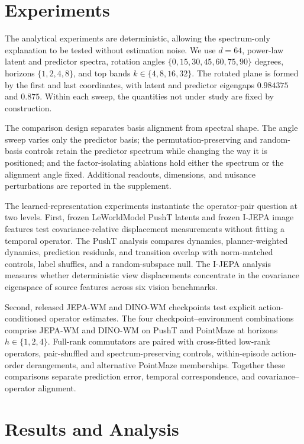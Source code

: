 \documentclass{article}
\begin{document}
\section{Experiments}

The analytical experiments are deterministic, allowing the spectrum-only explanation to be tested without estimation noise. We use $d=64$, power-law latent and predictor spectra, rotation angles $\{0,15,30,45,60,75,90\}$ degrees, horizons $\{1,2,4,8\}$, and top bands $k\in\{4,8,16,32\}$. The rotated plane is formed by the first and last coordinates, with latent and predictor eigengaps $0.984375$ and $0.875$. Within each sweep, the quantities not under study are fixed by construction.

The comparison design separates basis alignment from spectral shape. The angle sweep varies only the predictor basis; the permutation-preserving and random-basis controls retain the predictor spectrum while changing the way it is positioned; and the factor-isolating ablations hold either the spectrum or the alignment angle fixed. Additional readouts, dimensions, and nuisance perturbations are reported in the supplement.

The learned-representation experiments instantiate the operator-pair question at two levels. First, frozen LeWorldModel PushT latents and frozen I-JEPA image features test covariance-relative displacement measurements without fitting a temporal operator. The PushT analysis compares dynamics, planner-weighted dynamics, prediction residuals, and transition overlap with norm-matched controls, label shuffles, and a random-subspace null. The I-JEPA analysis measures whether deterministic view displacements concentrate in the covariance eigenspace of source features across six vision benchmarks.

Second, released JEPA-WM and DINO-WM checkpoints test explicit action-conditioned operator estimates. The four checkpoint--environment combinations comprise JEPA-WM and DINO-WM on PushT and PointMaze at horizons $h\in\{1,2,4\}$. Full-rank commutators are paired with cross-fitted low-rank operators, pair-shuffled and spectrum-preserving controls, within-episode action-order derangements, and alternative PointMaze memberships. Together these comparisons separate prediction error, temporal correspondence, and covariance--operator alignment.

\section{Results and Analysis}
\end{document}
